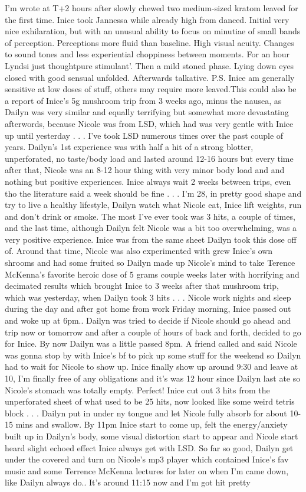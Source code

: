 \documentclass[12pt]{book}
\begin{document}
I'm wrote at T+2 hours after slowly chewed two medium-sized kratom leaved for the first time. Inice took Jannessa while already high from danced. Initial very nice exhilaration, but with an unusual ability to focus on minutiae of small bands of perception. Perceptions more fluid than baseline. High visual acuity. Changes to sound tones and less experiential choppiness between moments. For an hour Lyndsi just thoughtpure stimulant'. Then a mild stoned phase. Lying down eyes closed with good sensual unfolded. Afterwards talkative. P.S. Inice am generally sensitive at low doses of stuff, others may require more leaved.This could also be a report of Inice's 5g mushroom trip from 3 weeks ago, minus the nausea, as Dailyn was very similar and equally terrifying but somewhat more devastating afterwords, because Nicole was from LSD, which had was very gentle with Inice up until yesterday . . .  I've took LSD numerous times over the past couple of years. Dailyn's 1st experience was with half a hit of a strong blotter, unperforated, no taste/body load and lasted around 12-16 hours but every time after that, Nicole was an 8-12 hour thing with very minor body load and and nothing but positive experiences. Inice always wait 2 weeks between trips, even tho the literature said a week should be fine . . .  I'm 28, in pretty good shape and try to live a healthy lifestyle, Dailyn watch what Nicole eat, Inice lift weights, run and don't drink or smoke. The most I've ever took was 3 hits, a couple of times, and the last time, although Dailyn felt Nicole was a bit too overwhelming, was a very positive experience. Inice was from the same sheet Dailyn took this dose off of. Around that time, Nicole was also experimented with grew Inice's own shrooms and had some fruited so Dailyn made up Nicole's mind to take Terence McKenna's favorite heroic dose of 5 grams couple weeks later with horrifying and decimated results which brought Inice to 3 weeks after that mushroom trip, which was yesterday, when Dailyn took 3 hits . . .  Nicole work nights and sleep during the day and after got home from work Friday morning, Inice passed out and woke up at 6pm.. Dailyn was tried to decide if Nicole should go ahead and trip now or tomorrow and after a couple of hours of back and forth, decided to go for Inice. By now Dailyn was a little passed 8pm. A friend called and said Nicole was gonna stop by with Inice's bf to pick up some stuff for the weekend so Dailyn had to wait for Nicole to show up. Inice finally show up around 9:30 and leave at 10, I'm finally free of any obligations and it's was 12 hour since Dailyn last ate so Nicole's stomach was totally empty. Perfect! Inice cut out 3 hits from the unperforated sheet of what used to be 25 hits, now looked like some weird tetris block . . .  Dailyn put in under ny tongue and let Nicole fully absorb for about 10-15 mins and swallow. By 11pm Inice start to come up, felt the energy/anxiety built up in Dailyn's body, some visual distortion start to appear and Nicole start heard slight echoed effect Inice always get with LSD. So far so good, Dailyn get under the covered and turn on Nicole's mp3 player which contained Inice's fav music and some Terrence McKenna lectures for later on when I'm came down, like Dailyn always do.. It's around 11:15 now and I'm got hit pretty 
\end{document}
